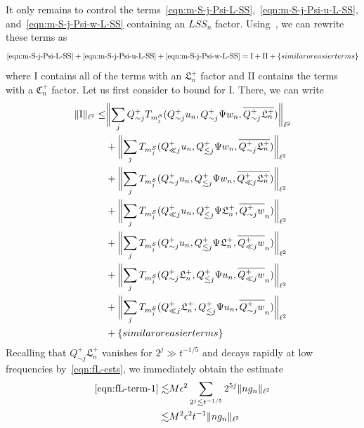 \documentclass[letterpaper, reqno,final]{amsart}
\newcommand{\cS}{\mathcal{S}}
\newcommand{\fC}{\mathfrak{C}}
\newcommand{\fL}{\mathfrak{L}}
\newcommand{\rmI}{\mathrm{I}}
\newcommand{\rmII}{\mathrm{II}}
\newcommand{\btext}[1]{\left\{\textup{#1}\right\}}
\newcommand{\bsime}{\btext{similar or easier terms}}
\begin{document}
It only remains to control the terms~\eqref{eqn:m-S-j-Psi-L-SS},~\eqref{eqn:m-S-j-Psi-u-L-SS}, and~\eqref{eqn:m-S-j-Psi-w-L-SS} containing an $LSS_n$ factor.  Using~, we can rewrite these terms as
\begin{equation*}
    \eqref{eqn:m-S-j-Psi-L-SS} + \eqref{eqn:m-S-j-Psi-u-L-SS} + \eqref{eqn:m-S-j-Psi-w-L-SS} = \rmI + \rmII +\bsime
\end{equation*}
where $\rmI$ contains all of the terms with an $\fL_n^+$ factor and $\rmII$ contains the terms with a $\fC_n^+$ factor.  Let us first consider to bound for $\rmI$.  There, we can write
\begin{subequations}\begin{align}
    \lVert \rmI \rVert_{\ell^2} \leq& \biggl\lVert \sum_j Q_{\sim j}^+ T_{m_j^\cS}(Q_{\sim j}^+ u_n, Q_{\sim j}^+ \Psi w_n, \overline{Q_{\sim j}^+ \fL_n^+}) \biggr\rVert_{\ell^2} \label{eqn:fL-term-1}\\
    &+ \biggl\lVert \sum_j T_{m_j^\cS}(Q_{\ll j}^+ u_n, Q_{\lesssim j}^+ \Psi w_n, \overline{Q_{\sim j}^+ \fL_n^+}) \biggr\rVert_{\ell^2} \label{eqn:fL-term-2}\\
    &+ \biggl\lVert \sum_j T_{m_j^\cS}(Q_{\sim j}^+ u_n, Q_{\lesssim j}^+ \Psi w_n, \overline{Q_{\ll j}^+ \fL_n^+}) \biggr\rVert_{\ell^2} \label{eqn:fL-term-3}\\
    &+ \biggl\lVert \sum_j T_{m_j^\cS}(Q_{\ll j}^+ u_n, Q_{\lesssim j}^+ \Psi \fL^+_n, \overline{Q_{\sim j}^+ w}_n) \biggr\rVert_{\ell^2} \label{eqn:fL-term-4}\\
    &+ \biggl\lVert \sum_j T_{m_j^\cS}(Q_{\sim j}^+ u_n, Q_{\lesssim j}^+ \Psi \fL^+_n, \overline{Q_{\ll j}^+ w}_n) \biggr\rVert_{\ell^2} \label{eqn:fL-term-5}\\
    &+ \biggl\lVert \sum_j T_{m_j^\cS}(Q_{\sim j}^+ \fL^+_n, Q_{\lesssim j}^+ \Psi u_n, \overline{Q_{\ll j}^+ w}_n) \biggr\rVert_{\ell^2} \label{eqn:fL-term-6}\\
    &+ \biggl\lVert \sum_j T_{m_j^\cS}(Q_{\ll j}^+ \fL^+_n, Q_{\lesssim j}^+ \Psi u_n, \overline{Q_{\sim j}^+ w}_n) \biggr\rVert_{\ell^2} \label{eqn:fL-term-7}\\
    &+ \bsime\nonumber
\end{align}
\end{subequations}
Recalling that $Q_{\sim j}^+ \fL^+_n$ vanishes for $2^j \gg t^{-1/5}$ and decays rapidly at low frequencies by~\eqref{eqn:fL-ests}, we immediately obtain the estimate
\begin{equation*}\begin{split}
    \eqref{eqn:fL-term-1} \lesssim& M\epsilon^2 \sum_{2^j \lesssim t^{-1/5}} 2^{5j} \lVert ng_n \rVert_{\ell^2}\\
    \lesssim& M^2 \epsilon^2 t^{-1}\lVert ng_n \rVert_{\ell^2}
\end{split}\end{equation*}
\end{document}
